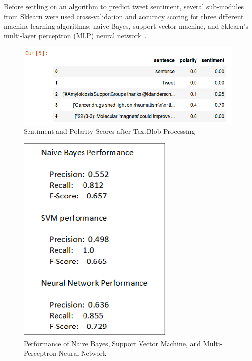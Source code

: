 Before settling on an algorithm to predict tweet sentiment, several
sub-modules from Sklearn were used cross-validation and accuracy
scoring for three different machine learning algorithms: naive Bayes,
support vector machine, and Sklearn's multi-layer perceptron (MLP)
neural
network~\cite{brownlee_2016,ads_algorithms,raschka2016}.

\begin{figure}[H]
\centering
\includegraphics[width=\columnwidth]{images/collected_tweets_head.png}
\caption{Sentiment and Polarity Scores after TextBlob Processing}
\label{fig:scores_textblob}
\end{figure} 

\begin{figure}[H]
\centering
\includegraphics[width=\columnwidth]{images/ML_algorithms_performance.png}
\caption{Performance of Naive Bayes, Support Vector Machine, and
  Multi-Perceptron Neural Network}
\label{fig:performance_scores}
\end{figure} 

